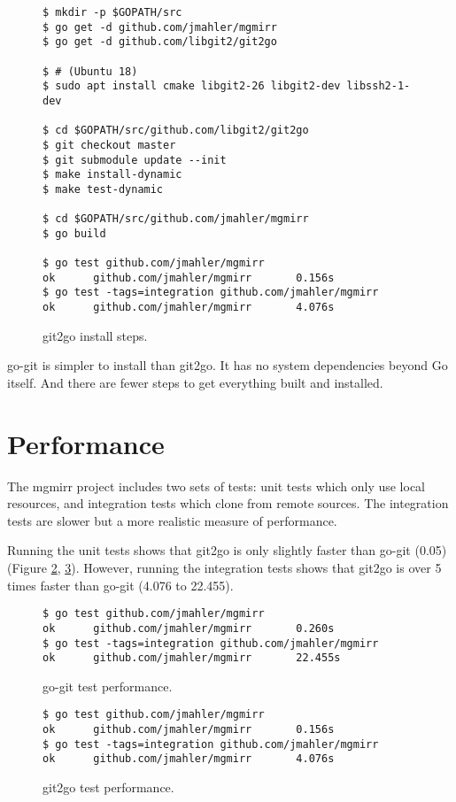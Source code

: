 \documentclass{article}
\begin{document}
\begin{figure}[h!]
\begin{lstlisting}
$ mkdir -p $GOPATH/src
$ go get -d github.com/jmahler/mgmirr
$ go get -d github.com/libgit2/git2go

$ # (Ubuntu 18)
$ sudo apt install cmake libgit2-26 libgit2-dev libssh2-1-dev

$ cd $GOPATH/src/github.com/libgit2/git2go
$ git checkout master
$ git submodule update --init
$ make install-dynamic
$ make test-dynamic

$ cd $GOPATH/src/github.com/jmahler/mgmirr
$ go build

$ go test github.com/jmahler/mgmirr
ok      github.com/jmahler/mgmirr       0.156s
$ go test -tags=integration github.com/jmahler/mgmirr
ok      github.com/jmahler/mgmirr       4.076s
\end{lstlisting}
\caption{git2go install steps.}
\label{fig:git2go-install}
\end{figure}

go-git is simpler to install than git2go.  It has no system dependencies
beyond Go itself.  And there are fewer steps to get everything built
and installed.

\section{Performance}

The mgmirr project includes two sets of tests: unit tests which only
use local resources, and integration tests which clone from remote
sources.
The integration tests are slower but a more realistic measure of performance.

Running the unit tests shows that git2go is only slightly faster than
go-git (0.05)
(Figure \ref{fig:go-git-performance}, \ref{fig:git2go-performance}).
However, running the integration tests shows that git2go is over
5 times faster than go-git (4.076 to 22.455).

\begin{figure}[!ht]
\begin{lstlisting}
$ go test github.com/jmahler/mgmirr
ok      github.com/jmahler/mgmirr       0.260s
$ go test -tags=integration github.com/jmahler/mgmirr
ok      github.com/jmahler/mgmirr       22.455s
\end{lstlisting}
\caption{go-git test performance.}
\label{fig:go-git-performance}
\end{figure}

\begin{figure}[!ht]
\begin{lstlisting}
$ go test github.com/jmahler/mgmirr
ok      github.com/jmahler/mgmirr       0.156s
$ go test -tags=integration github.com/jmahler/mgmirr
ok      github.com/jmahler/mgmirr       4.076s
\end{lstlisting}
\caption{git2go test performance.}
\label{fig:git2go-performance}
\end{figure}
\end{document}
